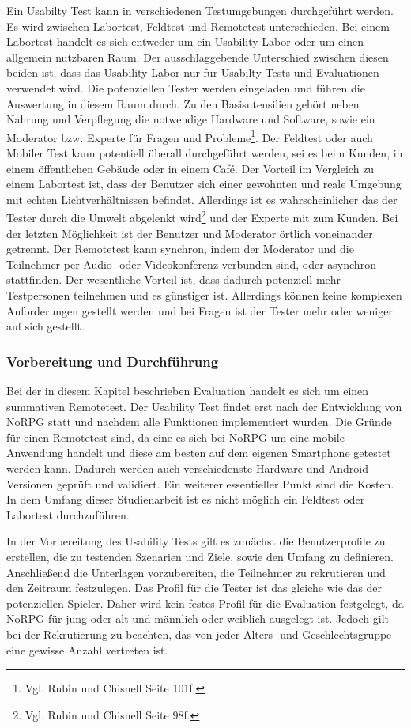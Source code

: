 			Ein Usabilty Test kann in verschiedenen Testumgebungen durchgeführt werden. Es wird zwischen Labortest, Feldtest und Remotetest unterschieden. Bei einem Labortest handelt es sich entweder um ein Usability Labor oder um einen allgemein nutzbaren Raum. Der ausschlaggebende Unterschied zwischen diesen beiden ist, dass das Usability Labor nur für Usabilty Tests und Evaluationen verwendet wird. Die potenziellen Tester werden eingeladen und führen die Auswertung in diesem Raum durch. Zu den Basisutensilien gehört neben Nahrung und Verpflegung die notwendige Hardware und Software, sowie ein Moderator bzw. Experte für Fragen und Probleme\footnote{Vgl. Rubin und Chisnell \cite{handbookUsability} Seite 101f.}. Der Feldtest oder auch Mobiler Test kann potentiell überall durchgeführt werden, sei es beim Kunden, in einem öffentlichen Gebäude oder in einem Café. Der Vorteil im Vergleich zu einem Labortest ist, dass der Benutzer sich einer gewohnten und reale Umgebung mit echten Lichtverhältnissen befindet. Allerdings ist es wahrscheinlicher das der Tester durch die Umwelt abgelenkt wird\footnote{Vgl. Rubin und Chisnell \cite{handbookUsability} Seite 98f.} und der Experte mit zum Kunden. Bei der letzten Möglichkeit ist der Benutzer und Moderator örtlich voneinander getrennt. Der Remotetest kann synchron, indem der Moderator und die Teilnehmer per Audio- oder Videokonferenz verbunden sind, oder asynchron stattfinden. Der wesentliche Vorteil ist, dass dadurch potenziell mehr Testpersonen teilnehmen und es günstiger ist. Allerdings können keine komplexen Anforderungen gestellt werden und bei Fragen ist der Tester mehr oder weniger auf sich gestellt.

			\subsubsection{Vorbereitung und Durchführung}
				Bei der in diesem Kapitel beschrieben Evaluation handelt es sich um einen summativen Remotetest. Der Usability Test findet erst nach der Entwicklung von NoRPG statt und nachdem alle Funktionen implementiert wurden. Die Gründe für einen Remotetest sind, da eine es sich bei NoRPG um eine mobile Anwendung handelt und diese am besten auf dem eigenen Smartphone getestet werden kann. Dadurch werden auch verschiedenste Hardware und Android Versionen geprüft und validiert. Ein weiterer essentieller Punkt sind die Kosten. In dem Umfang dieser Studienarbeit ist es nicht möglich ein Feldtest oder Labortest durchzuführen.

				In der Vorbereitung des Usability Tests gilt es zunächst die Benutzerprofile zu erstellen, die zu testenden Szenarien und Ziele, sowie den Umfang zu definieren. Anschließend die Unterlagen vorzubereiten, die Teilnehmer zu rekrutieren und den Zeitraum festzulegen. Das Profil für die Tester ist das gleiche wie das der potenziellen Spieler. Daher wird kein festes Profil für die Evaluation festgelegt, da NoRPG für jung oder alt und männlich oder weiblich ausgelegt ist. Jedoch gilt bei der Rekrutierung zu beachten, das von jeder Alters- und Geschlechtsgruppe eine gewisse Anzahl vertreten ist.

